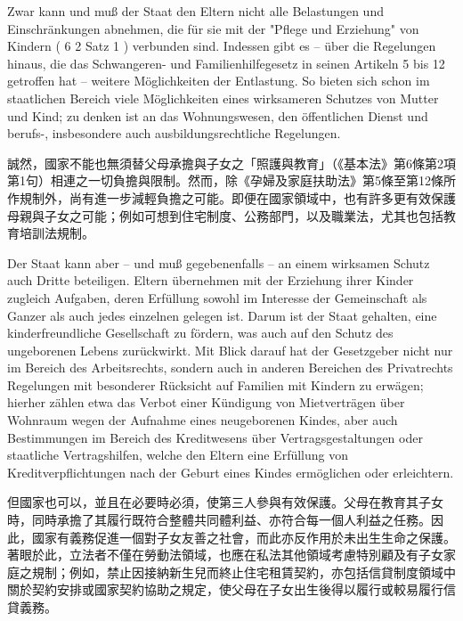 \documentclass[12pt]{article}
\begin{document}
\begin{sourcepara}[title={原文D.61}]
Zwar kann und muß der Staat den Eltern nicht alle Belastungen und Einschränkungen abnehmen, die für sie mit der "Pflege und Erziehung" von Kindern (\abbrArt{} 6 \abbrAbs{} 2 Satz 1 \abbrGG{}\ggfnArtSixTwoOneDE{}) verbunden sind. Indessen gibt es -- über die Regelungen hinaus, die das Schwangeren- und Familienhilfegesetz in seinen Artikeln 5 bis 12 getroffen hat -- weitere Möglichkeiten der Entlastung. So bieten sich schon im staatlichen Bereich viele Möglichkeiten eines wirksameren Schutzes von Mutter und Kind; zu denken ist an das Wohnungswesen, den öffentlichen Dienst und berufs-, insbesondere auch ausbildungsrechtliche Regelungen.
\end{sourcepara}
\begin{transpara}
誠然，國家不能也無須替父母承擔與子女之「照護與教育」（《基本法》第6條第2項第1句\ggfnArtSixTwoOneZH{}）相連之一切負擔與限制。然而，除《孕婦及家庭扶助法》第5條至第12條所作規制外，尚有進一步減輕負擔之可能。即便在國家領域中，也有許多更有效保護母親與子女之可能；例如可想到住宅制度、公務部門，以及職業法，尤其也包括教育培訓法規制。
\end{transpara}

\begin{sourcepara}[title={原文D.62}]
Der Staat kann aber -- und muß gegebenenfalls -- an einem wirksamen Schutz auch Dritte beteiligen. Eltern übernehmen mit der Erziehung ihrer Kinder zugleich Aufgaben, deren Erfüllung sowohl im Interesse der Gemeinschaft als Ganzer als auch jedes einzelnen gelegen ist. Darum ist der Staat gehalten, eine kinderfreundliche Gesellschaft zu fördern, was auch auf den Schutz des ungeborenen Lebens zurückwirkt. Mit Blick darauf hat der Gesetzgeber nicht nur im Bereich des Arbeitsrechts, sondern auch in anderen Bereichen des Privatrechts Regelungen mit besonderer Rücksicht auf Familien mit Kindern zu erwägen; hierher zählen etwa das Verbot einer Kündigung von Mietverträgen über Wohnraum wegen der Aufnahme eines neugeborenen Kindes, aber auch Bestimmungen im Bereich des Kreditwesens über Vertragsgestaltungen oder staatliche Vertragshilfen, welche den Eltern eine Erfüllung von Kreditverpflichtungen nach der Geburt eines Kindes ermöglichen oder erleichtern.
\end{sourcepara}
\begin{transpara}
但國家也可以，並且在必要時必須，使第三人參與有效保護。父母在教育其子女時，同時承擔了其履行既符合整體共同體利益、亦符合每一個人利益之任務。因此，國家有義務促進一個對子女友善之社會，而此亦反作用於未出生生命之保護。著眼於此，立法者不僅在勞動法領域，也應在私法其他領域考慮特別顧及有子女家庭之規制；例如，禁止因接納新生兒而終止住宅租賃契約，亦包括信貸制度領域中關於契約安排或國家契約協助之規定，使父母在子女出生後得以履行或較易履行信貸義務。
\end{transpara}
\end{document}
